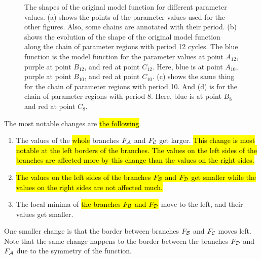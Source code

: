 \begin{figure}
	\centering
	\caption[Effects of parameters on the original model function]{
		The shapes of the original model function for different parameter values.
		(a) shows the points of the parameter values used for the other figures.
		Also, some chains are annotated with their period.
		(b) shows the evolution of the shape of the original model function along the chain of parameter regions with period 12 cycles.
		The blue function is the model function for the parameter values at point $A_{12}$, purple at point $B_{12}$, and red at point $C_{12}$.
		Here, blue is at point $A_{10}$, purple at point $B_{10}$, and red at point $C_{10}$.
		(c) shows the same thing for the chain of parameter regions with period 10.
		And (d) is for the chain of parameter regions with period 8.
		Here, blue is at point $B_8$ and red at point $C_8$.
	}
	\label{fig:setup.char.evolution.combined}
\end{figure}

The most notable changes are \hl{the following}.
\begin{enumerate}
	\item The values of the \hl{whole} branches $F_{\mathcal{A}}$ and $F_{\mathcal{C}}$ get larger.
	      \hl{
		      This change is most notable at the left borders of the branches.
		      The values on the left sides of the branches are affected more by this change than the values on the right sides.
	      }
	\item \hl{
		      The values on the left sides of the branches $F_{\mathcal{B}}$ and $F_{\mathcal{D}}$ get smaller while the values on the right sides are not affected much.
	      }
	\item The local minima of \hl{the branches $F_{\mathcal{B}}$ and $F_{\mathcal{D}}$} move to the left, and their values get smaller.
\end{enumerate}
One smaller change is that the border between branches $F_{\mathcal{B}}$ and $F_{\mathcal{C}}$ moves left.
Note that the same change happens to the border between the branches $F_{\mathcal{D}}$ and $F_{\mathcal{A}}$ due to the symmetry of the function.

